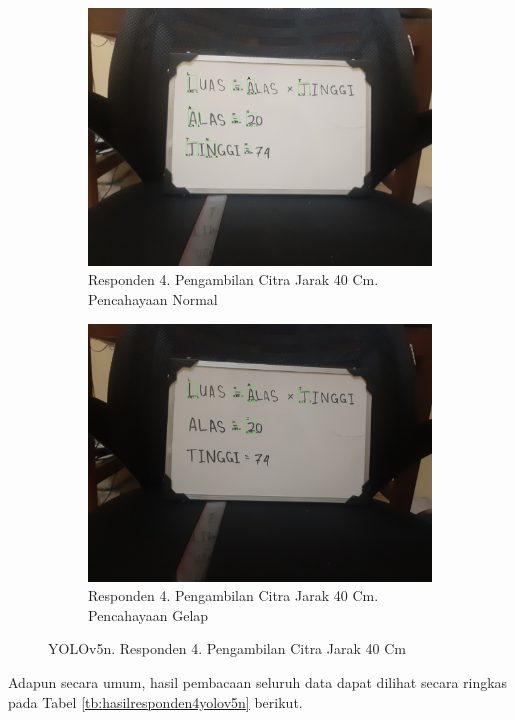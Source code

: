 \begin{figure}[H]
  \begin{subfigure}{.5\textwidth}
    \centering
    \captionsetup{width=.8\linewidth}
    \includegraphics[width=.8\linewidth]{gambar/yolov5n/responden4/hakimaxt40cm00-result.jpg}
    \caption{Responden 4. Pengambilan Citra Jarak 40 Cm. Pencahayaan Normal}
    \label{fig:nr4tcitra40cm}
  \end{subfigure}%
  \begin{subfigure}{.5\textwidth}
    \centering
    \captionsetup{width=.8\linewidth}
    \includegraphics[width=.8\linewidth]{gambar/yolov5n/responden4/hakimaxt40cm10-result.jpg}
    \caption{Responden 4. Pengambilan Citra Jarak 40 Cm. Pencahayaan Gelap}
    \label{fig:nr4gcitra40cm}
  \end{subfigure}
  \caption{YOLOv5n. Responden 4. Pengambilan Citra Jarak 40 Cm}
  \label{fig:nr4citra40cm}
\end{figure}


Adapun secara umum, hasil pembacaan seluruh data dapat dilihat secara ringkas pada Tabel \ref*{tb:hasilresponden4yolov5n} berikut.

